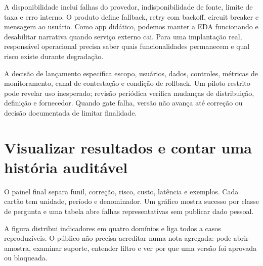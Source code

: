 A disponibilidade inclui falhas do provedor, indisponibilidade de fonte, limite de taxa e erro interno. O produto define fallback, retry com backoff, circuit breaker e mensagem ao usuário. Como app didático, podemos manter a EDA funcionando e desabilitar narrativa quando serviço externo cai. Para uma implantação real, responsável operacional precisa saber quais funcionalidades permanecem e qual risco existe durante degradação.

A decisão de lançamento especifica escopo, usuários, dados, controles, métricas de monitoramento, canal de contestação e condição de rollback. Um piloto restrito pode revelar uso inesperado; revisão periódica verifica mudanças de distribuição, definição e fornecedor. Quando gate falha, versão não avança até correção ou decisão documentada de limitar finalidade.

\section{Visualizar resultados e contar uma história auditável}

O painel final separa funil, correção, risco, custo, latência e exemplos. Cada cartão tem unidade, período e denominador. Um gráfico mostra sucesso por classe de pergunta e uma tabela abre falhas representativas sem publicar dado pessoal.

\begin{center}
\end{center}

A figura distribui indicadores em quatro domínios e liga todos a casos reproduzíveis. O público não precisa acreditar numa nota agregada: pode abrir amostra, examinar suporte, entender filtro e ver por que uma versão foi aprovada ou bloqueada.

